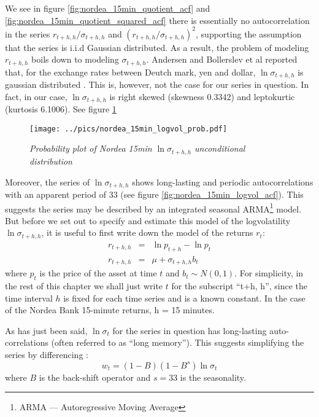 We see in figure \ref{fig:nordea_15min_quotient_acf} and
\ref{fig:nordea_15min_quotient_squared_acf} there is essentially no
autocorrelation in the series $r_{t+h, h} / \sigma_{t+h, h}$ and
$(r_{t+h, h} / \sigma_{t+h, h})^2$, supporting the assumption that the
series is i.i.d Gaussian distributed. As a result, the problem of
modeling $r_{t+h, h}$ boils down to modeling $\sigma_{t+h,
  h}$. Andersen and Bollerslev et al reported that, for the exchange
rates between Deutch mark, yen and dollar, $\ln \sigma_{t+h, h}$ is
gaussian distributed \cite{Andersen03}. This is, however, not the case
for our series in question. In fact, in our case, $\ln \sigma_{t+h,
  h}$ is right skewed (skewness 0.3342) and leptokurtic (kurtosis
6.1006). See figure \ref{fig:nordea_15min_logvol_prob}
\begin{figure}[htb!]
  \centering
  \texttt{[image: ../pics/nordea\_15min\_logvol\_prob.pdf]}
  \caption{\small \it Probability plot of Nordea 15min
    $\ln\sigma_{t+h, h}$ unconditional distribution}
  \label{fig:nordea_15min_logvol_prob}
\end{figure}

Moreover, the series of $\ln\sigma_{t+h, h}$ shows long-lasting and
periodic autocorrelations with an apparent period of 33 (see figure
\ref{fig:nordea_15min_logvol_acf}). This suggests the series may be
described by an integrated seasonal ARMA\footnote{ARMA ---
  Autoregressive Moving Average} model. But before we set out
to specify and estimate this model of the logvolatility
$\ln\sigma_{t+h, h}$, it is useful to first write down the model of
the returns $r_t$:
\begin{eqnarray}
   r_{t+h, h} &=& \ln p_{t+h} - \ln p_t \nonumber \\
   r_{t+h, h} &=& \mu + \sigma_{t+h, h} b_t \label{eq:SLV_spec}
\end{eqnarray}
where $p_t$ is the price of the asset at time $t$ and $b_t \sim N(0,
1)$. For simplicity, in the rest of this chapter we shall just write
$t$ for the subscript ``t+h, h'', since the time interval $h$ is fixed
for each time series and is a known constant. In the case of the
Nordea Bank 15-minute returns, h = 15 minutes.

As has just been said, $\ln \sigma_t$ for the series in question has
long-lasting auto-correlations (often referred to as ``long
memory''). This suggests simplifying the series by differencing
\cite{BoxJenkins94}:
\[
w_t = (1-B)(1-B^s)\ln\sigma_t
\]
where $B$ is the back-shift operator and $s=33$ is the seasonality.

